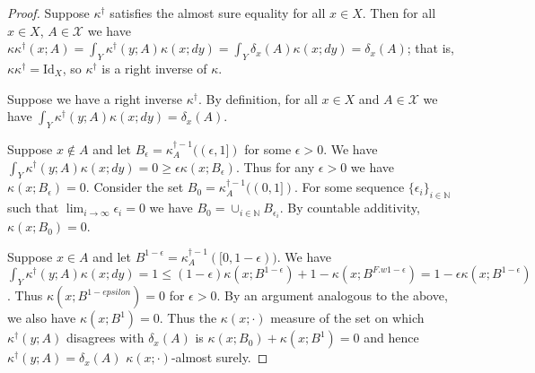 \begin{proof}
Suppose $\kappa^\dagger$ satisfies the almost sure equality for all $x\in X$. Then for all $x\in X$, $A\in \mathcal{X}$ we have $\kappa \kappa^\dagger (x;A) = \int_Y \kappa^\dagger(y;A) \kappa(x;dy) = \int_Y \delta_x (A) \kappa(x;dy) = \delta_x(A)$; that is, $\kappa\kappa^\dagger = \mathrm{Id}_X$, so $\kappa^\dagger$ is a right inverse of $\kappa$.

Suppose we have a right inverse $\kappa^\dagger$. By definition, for all $x\in X$ and $A\in\mathcal{X}$ we have $\int_Y \kappa^\dagger(y;A) \kappa(x;dy)=\delta_x(A)$. 

Suppose $x\not\in A$ and let $B_\epsilon=\kappa^{\dagger-1}_A((\epsilon,1])$ for some $\epsilon>0$. We have $\int_Y \kappa^\dagger(y;A) \kappa(x;dy)=0\geq\epsilon\kappa(x;B_\epsilon)$. Thus for any $\epsilon>0$ we have $\kappa(x;B_\epsilon)=0$. Consider the set $B_0=\kappa^{\dagger-1}_A((0,1])$. For some sequence $\{\epsilon_i\}_{i\in \mathbb{N}}$ such that $\lim_{i\to\infty} \epsilon_i = 0$ we have $B_0=\cup_{i\in\mathbb{N}} B_{\epsilon_i}$. By countable additivity, $\kappa(x;B_0)=0$. 

Suppose $x\in A$ and let $B^{1-\epsilon}=\kappa^{\dagger-1}_A([0,1-\epsilon))$. We have $\int_Y \kappa^\dagger(y;A) \kappa(x;dy)=1\leq(1-\epsilon)\kappa(x;B^{1-\epsilon})+1-\kappa(x;B^{F.w1-\epsilon})=1-\epsilon \kappa(x;B^{1-\epsilon})$. Thus $\kappa(x;B^{1-epsilon})=0$ for $\epsilon>0$. By an argument analogous to the above, we also have $\kappa(x;B^1)=0$. Thus the $\kappa(x;\cdot)$ measure of the set on which $\kappa^\dagger(y;A)$ disagrees with $\delta_x(A)$ is $\kappa(x;B_0) + \kappa(x;B^1)=0$ and hence $\kappa^\dagger(y;A)=\delta_x(A)$ $\kappa(x;\cdot)$-almost surely.
\end{proof}




